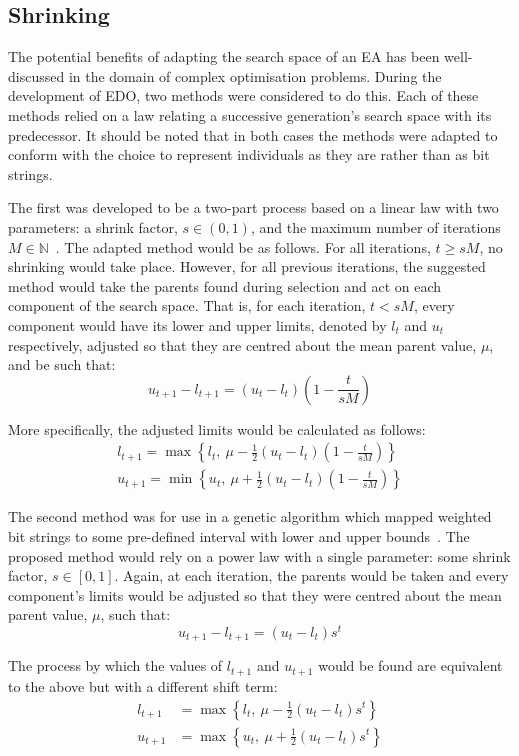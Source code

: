 \subsection{Shrinking}

The potential benefits of adapting the search space of an EA has been
well-discussed in the domain of complex optimisation problems. During the
development of EDO, two methods were considered to do this. Each of these
methods relied on a law relating a successive generation's search space with its
predecessor. It should be noted that in both cases the methods were adapted to
conform with the choice to represent individuals as they are rather than as bit
strings.

The first was developed to be a two-part process based on a linear law with two
parameters: a shrink factor, \(s \in (0, 1)\), and the maximum number of
iterations \(M \in \mathbb{N}\)~\cite{Amirjanov2017}. The adapted method would
be as follows. For all iterations, \(t \geq sM\), no shrinking would take place.
However, for all previous iterations, the suggested method would take the
parents found during selection and act on each component of the search space.
That is, for each iteration, \(t < sM\), every component would have its lower
and upper limits, denoted by \(l_t\) and \(u_t\) respectively, adjusted so that
they are centred about the mean parent value, \(\mu\), and be such that:
\[
    u_{t+1} - l_{t+1} = (u_t - l_t) \left(1 - \frac{t}{sM}\right)
\]

More specifically, the adjusted limits would be calculated as follows:
\begin{align*}
    l_{t+1} = \max \left\{%
        l_t, \ \mu - \frac{1}{2} (u_t - l_t) \left(1 - \frac{t}{sM}\right)
    \right\}\\
    u_{t+1} = \min \left\{%
        u_t, \ \mu + \frac{1}{2} (u_t - l_t) \left(1 - \frac{t}{sM}\right)
    \right\}
\end{align*}

The second method was for use in a genetic algorithm which mapped weighted bit
strings to some pre-defined interval with lower and upper
bounds~\cite{Amirjanov2016}. The proposed method would rely on a power law with
a single parameter: some shrink factor, \(s \in [0, 1]\). Again, at each
iteration, the parents would be taken and every component's limits would be
adjusted so that they were centred about the mean parent value, \(\mu\), such
that:
\[
    u_{t+1} - l_{t+1} = (u_t - l_t) s^t
\]

The process by which the values of \(l_{t+1}\) and \(u_{t+1}\) would be found
are equivalent to the above but with a different shift term:
\begin{align}
    \label{eq:shrinking_lower}
    l_{t+1}&= \max \left\{l_t, \ \mu - \frac{1}{2} (u_t - l_t) s^t\right\}\\
    \label{eq:shrinking_upper}
    u_{t+1}&= \max \left\{u_t, \ \mu + \frac{1}{2} (u_t - l_t) s^t\right\}
\end{align}


